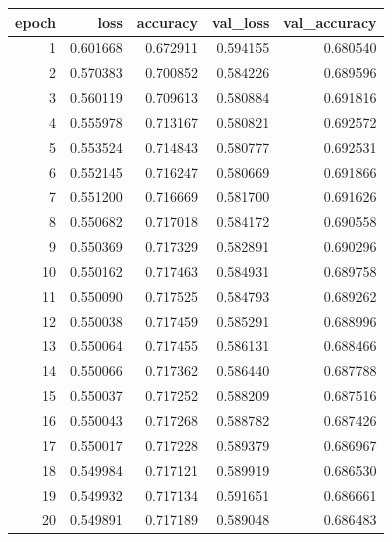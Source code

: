\begin{tabular}{rrrrr}
\toprule
epoch & loss & accuracy & val_loss & val_accuracy \\
\midrule
1 & 0.601668 & 0.672911 & 0.594155 & 0.680540 \\
2 & 0.570383 & 0.700852 & 0.584226 & 0.689596 \\
3 & 0.560119 & 0.709613 & 0.580884 & 0.691816 \\
4 & 0.555978 & 0.713167 & 0.580821 & 0.692572 \\
5 & 0.553524 & 0.714843 & 0.580777 & 0.692531 \\
6 & 0.552145 & 0.716247 & 0.580669 & 0.691866 \\
7 & 0.551200 & 0.716669 & 0.581700 & 0.691626 \\
8 & 0.550682 & 0.717018 & 0.584172 & 0.690558 \\
9 & 0.550369 & 0.717329 & 0.582891 & 0.690296 \\
10 & 0.550162 & 0.717463 & 0.584931 & 0.689758 \\
11 & 0.550090 & 0.717525 & 0.584793 & 0.689262 \\
12 & 0.550038 & 0.717459 & 0.585291 & 0.688996 \\
13 & 0.550064 & 0.717455 & 0.586131 & 0.688466 \\
14 & 0.550066 & 0.717362 & 0.586440 & 0.687788 \\
15 & 0.550037 & 0.717252 & 0.588209 & 0.687516 \\
16 & 0.550043 & 0.717268 & 0.588782 & 0.687426 \\
17 & 0.550017 & 0.717228 & 0.589379 & 0.686967 \\
18 & 0.549984 & 0.717121 & 0.589919 & 0.686530 \\
19 & 0.549932 & 0.717134 & 0.591651 & 0.686661 \\
20 & 0.549891 & 0.717189 & 0.589048 & 0.686483 \\
\bottomrule
\end{tabular}
